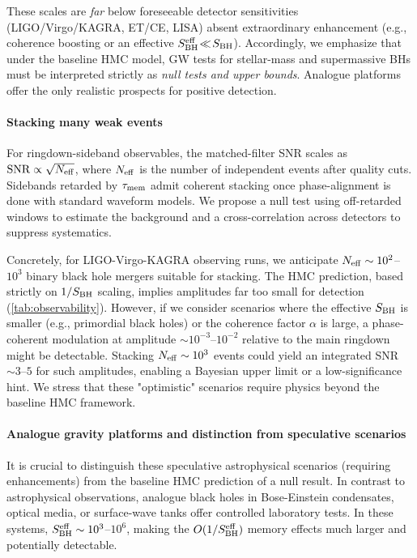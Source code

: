 \documentclass[a4paper,11pt]{article}
\newcommand{\eg}{e.g.\xspace}
\newcommand{\HMC}{\textup{\textsc{HMC}}\xspace}
\theoremstyle{plain}
\theoremstyle{definition}
\theoremstyle{remark}
\begin{document}
These scales are \emph{far} below foreseeable detector sensitivities (LIGO/Virgo/KAGRA, ET/CE, LISA) absent extraordinary enhancement (\eg, coherence boosting or an effective $S_{\rm BH}^{\rm eff}\!\ll\!S_{\rm BH}$).
Accordingly, we emphasize that under the baseline \HMC{} model, GW tests for stellar-mass and supermassive BHs must be interpreted strictly as \emph{null tests and upper bounds}. Analogue platforms offer the only realistic prospects for positive detection.

\paragraph{Stacking many weak events}
For ringdown-sideband observables, the matched-filter SNR scales as ${\rm SNR}\propto \sqrt{N_{\rm eff}}$, where $N_{\rm eff}$ is the number of independent events after quality cuts. Sidebands retarded by $\tau_{\rm mem}$ admit coherent stacking once phase-alignment is done with standard waveform models. We propose a null test using off-retarded windows to estimate the background and a cross-correlation across detectors to suppress systematics.

Concretely, for LIGO-Virgo-KAGRA observing runs, we anticipate $N_{\rm eff} \sim 10^2$--$10^3$ binary black hole mergers suitable for stacking. The \HMC{} prediction, based strictly on $1/S_{\rm BH}$ scaling, implies amplitudes far too small for detection (\cref{tab:observability}). However, if we consider scenarios where the effective $S_{\rm BH}$ is smaller (\eg, primordial black holes) or the coherence factor $\alpha$ is large, a phase-coherent modulation at amplitude $\sim 10^{-3}$--$10^{-2}$ relative to the main ringdown might be detectable. Stacking $N_{\rm eff} \sim 10^3$ events could yield an integrated SNR $\sim 3$--$5$ for such amplitudes, enabling a Bayesian upper limit or a low-significance hint.
We stress that these "optimistic" scenarios require physics beyond the baseline \HMC{} framework.

\paragraph{Analogue gravity platforms and distinction from speculative scenarios}
It is crucial to distinguish these speculative astrophysical scenarios (requiring enhancements) from the baseline \HMC{} prediction of a null result.
In contrast to astrophysical observations, analogue black holes in Bose-Einstein condensates, optical media, or surface-wave tanks offer controlled laboratory tests. In these systems, $S_{\rm BH}^{\rm eff} \sim 10^3$--$10^6$, making the $O(1/S_{\rm BH}^{\rm eff})$ memory effects much larger and potentially detectable.
\end{document}
